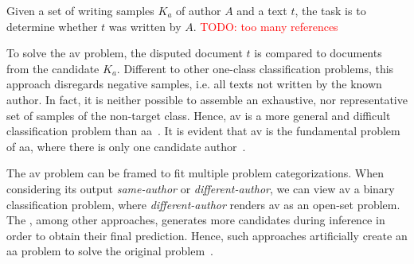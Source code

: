 \begin{definition}
    [\acl{av}]   
    Given a set of writing samples $K_a$ of author $A$ and a text $t$, the task is to determine whether $t$ was written by $A$.
    \textcolor{red}{TODO: too many references}
\end{definition}


To solve the \ac{av} problem, the disputed document $t$ is compared to documents from the candidate $K_a$.
Different to other one-class classification problems, this approach disregards negative samples, i.e. all texts not written by the known author.
In fact, it is neither possible to assemble an exhaustive, nor representative set of samples of the non-target class.
Hence, \ac{av} is a more general and difficult classification problem than \ac{aa}~\citep{llm_detection_av_2025,neal_surveying_2018,koppel_authorship_2004}.
It is evident that \ac{av} is the fundamental problem of \ac{aa}, where there is only one candidate author~\citep{barlas_cross_domain_2020,tyo_state_2022}.

The \ac{av} problem can be framed to fit multiple problem categorizations.
When considering its output \textit{same-author} or \textit{different-author}, we can view \ac{av} a binary classification problem, where \textit{different-author} renders \ac{av} as an open-set problem.
The \impAppr{}, among other approaches, generates more candidates during inference in order to obtain their final prediction.
Hence, such approaches artificially create an \ac{aa} problem to solve the original problem~\citep{neal_surveying_2018}.

